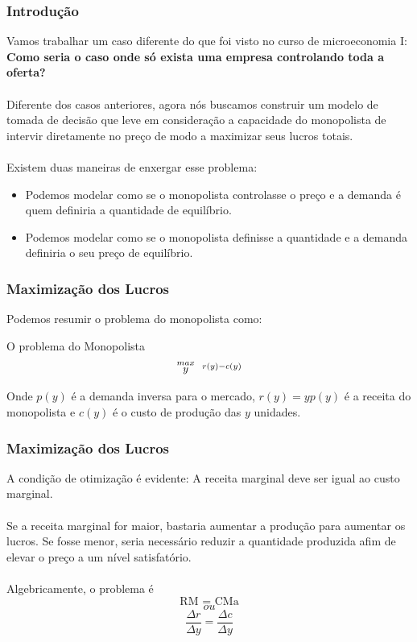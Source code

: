 \documentclass{beamer}[10]
\begin{document}

\begin{frame}
	\frametitle{Introdução}

	Vamos trabalhar um caso diferente do que foi visto no curso de microeconomia I: \textbf{Como seria o caso onde só exista uma empresa controlando toda a oferta?}
	\\~\\
	Diferente dos casos anteriores, agora nós buscamos construir um modelo de tomada de decisão que leve em consideração a capacidade do monopolista de intervir diretamente no preço de modo a maximizar seus lucros totais.
	\\~\\
	Existem duas maneiras de enxergar esse problema:
	\begin{itemize}
		\item Podemos modelar como se o monopolista controlasse o preço e a demanda é quem definiria a quantidade de equilíbrio.
		\item Podemos modelar como se o monopolista definisse a quantidade e a demanda definiria o seu preço de equilíbrio.
	\end{itemize}
\end{frame}


\begin{frame}
	\frametitle{Maximização dos Lucros}

	Podemos resumir o problema do monopolista como:

	\begin{block}{O problema do Monopolista}
		\LARGE $$ \stackrel{max}{\text{\small $y$}} \ \ \stackrel{r(y) - c(y)}{\ } $$
	\end{block}

	Onde $p(y)$ é a demanda inversa para o mercado, $r(y) = yp(y)$ é a receita do monopolista e $c(y)$ é o custo de produção das $y$ unidades.
\end{frame}

\begin{frame}
	\frametitle{Maximização dos Lucros}

	A condição de otimização é evidente: A receita marginal deve ser igual ao custo marginal.
	\\~\\
	Se a receita marginal for maior, bastaria aumentar a produção para aumentar os lucros. Se fosse menor, seria necessário reduzir a quantidade produzida afim de elevar o preço a um nível satisfatório.
	\\~\\
	Algebricamente, o problema é
	$$ \textrm{RM = CMa} $$
	$$ ou $$
	$$ \frac{\Delta r}{\Delta y} = \frac{\Delta c}{\Delta y} $$
\end{frame}
\end{document}
